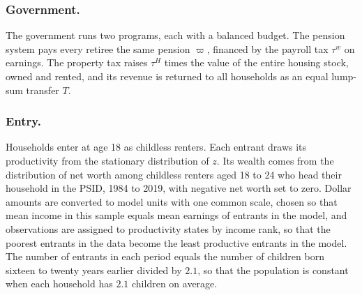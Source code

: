 \subsubsection*{Government.}
The government runs two programs, each with a balanced budget. The pension
system pays every retiree the same pension $\varpi$, financed by the payroll
tax $\tau^w$ on earnings. The property tax raises $\tau^H$ times the value of
the entire housing stock, owned and rented, and its revenue is returned to
all households as an equal lump-sum transfer $T$.

\subsubsection*{Entry.}
Households enter at age 18 as childless renters. Each entrant draws its
productivity from the stationary distribution of $z$. Its wealth comes from the
distribution of net worth among childless renters aged 18 to 24 who head their
household in the PSID, 1984 to 2019, with negative net worth set to zero.
Dollar amounts are converted to model units with one common scale, chosen so
that mean income in this sample equals mean earnings of entrants in the model,
and observations are assigned to productivity states by income rank, so that
the poorest entrants in the data become the least productive entrants in the
model. The number of entrants in each period equals the number of children
born sixteen to twenty years earlier divided by $2.1$, so that the population
is constant when each household has $2.1$ children on average.

